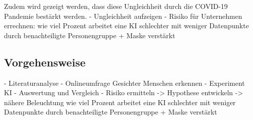 Zudem wird gezeigt werden, dass diese Ungleichheit durch die COVID-19 Pandemie bestärkt werden.
- Ungleichheit aufzeigen
- Risiko für Unternehmen errechnen: wie viel Prozent arbeitet eine KI schlechter mit weniger Datenpunkte durch benachteiligte Personengruppe + Maske verstärkt

\subsection{Vorgehensweise}
- Literaturanalyse 
- Onlineumfrage Gesichter Menschen erkennen
- Experiment KI
- Auswertung und Vergleich 
- Risiko ermitteln -> Hypothese entwickeln -> nähere Beleuchtung wie viel Prozent arbeitet eine KI schlechter mit weniger Datenpunkte durch benachteiligte Personengruppe + Maske verstärkt